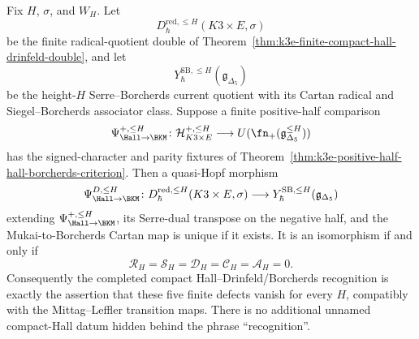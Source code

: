 \begin{theorem}
\label{thm:k3e-constructed-finite-double-recognition}
Fix \(H\), \(\sigma\), and \(W_H\). Let
\[
 D^{\mathrm{red},\leq H}_{\hbar}(K3\times E,\sigma)
\]
be the finite radical-quotient double of
Theorem~\ref{thm:k3e-finite-compact-hall-drinfeld-double}, and let
\[
 Y^{\mathrm{SB},\leq H}_{\hbar}(\mathfrak g_{\Delta_5})
\]
be the height-\(H\) Serre--Borcherds current quotient with its Cartan
radical and Siegel--Borcherds associator class. Suppose a finite
positive-half comparison
\[
 \Psi^{+,\leq H}_{\Hall\to\BKM}\colon
 \mathcal H^{+,\leq H}_{K3\times E}
 \longrightarrow
 U(\fn_+(\mathfrak g_{\Delta_5}^{\leq H}))
\]
has the signed-character and parity fixtures of
Theorem~\ref{thm:k3e-positive-half-hall-borcherds-criterion}. Then a
quasi-Hopf morphism
\[
 \Psi^{D,\leq H}_{\Hall\to\BKM}\colon
 D^{\mathrm{red},\leq H}_{\hbar}(K3\times E,\sigma)
 \longrightarrow
 Y^{\mathrm{SB},\leq H}_{\hbar}(\mathfrak g_{\Delta_5})
\]
extending \(\Psi^{+,\leq H}_{\Hall\to\BKM}\), its Serre-dual transpose
on the negative half, and the Mukai-to-Borcherds Cartan map is unique
if it exists. It is an isomorphism if and only if
\[
 \mathcal R_H=\mathcal S_H=\mathcal D_H=\mathcal C_H=\mathcal A_H=0.
\]
Consequently the completed compact Hall--Drinfeld/Borcherds
recognition is exactly the assertion that these five finite defects
vanish for every \(H\), compatibly with the Mittag--Leffler transition
maps. There is no additional unnamed compact-Hall datum hidden behind
the phrase ``recognition''.
\end{theorem}

